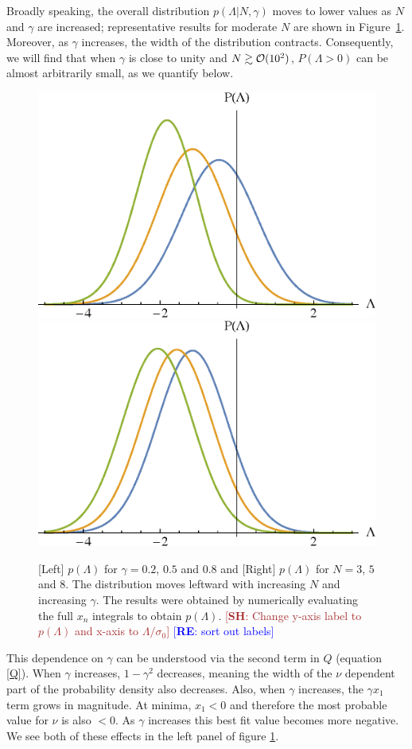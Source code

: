 \documentclass[12pt]{article}
\newcommand{\re}[1]{\textcolor{blue}{[{\bf RE}: #1]}}
\newcommand{\SH}[1]{\textcolor{brown}{[{\bf SH}: #1]}}
\begin{document}
Broadly speaking, the overall distribution $p(\Lambda | N,\gamma)$ moves to lower values as $N$ and $\gamma$ are increased;  representative results for moderate $N$ are shown in Figure~\ref{distributions}. Moreover, as $\gamma$ increases, the width of the distribution contracts. Consequently, we will find that when $\gamma$ is close to unity and $N \gtrsim {\cal{O}}(10^2)$, $P(\Lambda >0)$ can be almost arbitrarily small, as we quantify below. 


\begin{figure}
  \centering
  \includegraphics[width=0.45 \linewidth]{PLam_gamma.eps}  \hfill
  \includegraphics[width=0.45 \linewidth]{PLam_N.eps}
  \caption{[Left] $p(\Lambda)$ for $\gamma = 0.2$, $0.5$ and $0.8$ and [Right] $p(\Lambda)$ for $N=3$, $5$ and $8$. The distribution moves leftward with increasing $N$ and increasing $\gamma$. The results were obtained by numerically evaluating the full $x_n$ integrals to obtain $p(\Lambda)$. \SH{Change y-axis label to $p(\Lambda)$ and x-axis to $\Lambda/\sigma_0$} \re{sort out labels}}
  \label{distributions}
  \end{figure}

This dependence on $\gamma$ can be understood via the second term in $Q$ (equation \eqref{Q}). When $\gamma$ increases, $1-\gamma^2$ decreases, meaning the width of the $\nu$ dependent part of the probability density also decreases. Also, when $\gamma$ increases, the $\gamma x_1$ term grows in magnitude. At minima, $x_1 <0$ and therefore the most probable value for $\nu$ is also $<0$. As $\gamma$ increases this best fit value becomes more negative. We see both of these effects in the left panel of figure \ref{distributions}.
\end{document}
